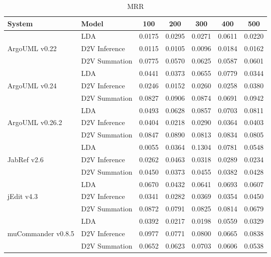\begin{table}
    \centering
\begin{tabular}{llccccc}
\toprule
System & Model &     100 &    200 &    300 &    400 &    500 \\
\midrule
                   &             LDA & 0.0175 & 0.0295 & 0.0271 & 0.0611 & 0.0220 \\
ArgoUML v0.22      & D2V Inference   & 0.0115 & 0.0105 & 0.0096 & 0.0184 & 0.0162 \\
                   & D2V Summation   & 0.0775 & 0.0570 & 0.0625 & 0.0587 & 0.0601 \\
                     \midrule
                   &             LDA & 0.0441 & 0.0373 & 0.0655 & 0.0779 & 0.0344 \\
ArgoUML v0.24      & D2V Inference   & 0.0246 & 0.0152 & 0.0260 & 0.0258 & 0.0380 \\
                   & D2V Summation   & 0.0827 & 0.0906 & 0.0874 & 0.0691 & 0.0942 \\
                     \midrule
                   &             LDA & 0.0493 & 0.0628 & 0.0857 & 0.0703 & 0.0811 \\
ArgoUML v0.26.2    & D2V Inference   & 0.0404 & 0.0218 & 0.0290 & 0.0364 & 0.0403 \\
                   & D2V Summation   & 0.0847 & 0.0890 & 0.0813 & 0.0834 & 0.0805 \\
                     \midrule
                   &             LDA & 0.0055 & 0.0364 & 0.1304 & 0.0781 & 0.0548 \\
JabRef v2.6        & D2V Inference   & 0.0262 & 0.0463 & 0.0318 & 0.0289 & 0.0234 \\
                   & D2V Summation   & 0.0450 & 0.0373 & 0.0455 & 0.0382 & 0.0428 \\
                     \midrule
                   &             LDA & 0.0670 & 0.0432 & 0.0641 & 0.0693 & 0.0607 \\
jEdit v4.3         & D2V Inference   & 0.0341 & 0.0282 & 0.0369 & 0.0354 & 0.0450 \\
                   & D2V Summation   & 0.0872 & 0.0791 & 0.0825 & 0.0814 & 0.0679 \\
                     \midrule
                   &             LDA & 0.0392 & 0.0217 & 0.0198 & 0.0559 & 0.0329 \\
muCommander v0.8.5 & D2V Inference   & 0.0977 & 0.0771 & 0.0800 & 0.0665 & 0.0838 \\
                   & D2V Summation   & 0.0652 & 0.0623 & 0.0703 & 0.0606 & 0.0538 \\

\bottomrule
\end{tabular}
\caption{MRR}
\label{tab:mrr}
\end{table}
